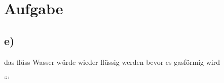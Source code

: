 \section*{Aufgabe}



\subsection*{e)}

das flüss Wasser würde wieder flüssig werden bevor es gasförmig wird

```